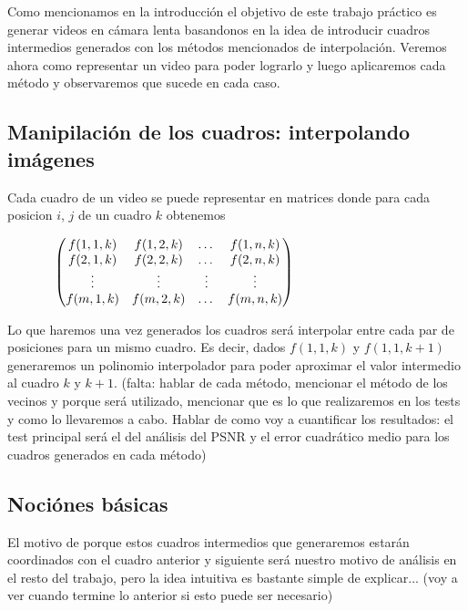Como mencionamos en la introducción el objetivo de este trabajo práctico es generar videos en cámara lenta basandonos en la idea de introducir cuadros intermedios generados con los métodos mencionados de interpolación. Veremos ahora como representar un video para poder lograrlo y luego aplicaremos cada método y observaremos que sucede en cada caso.

\subsection{Manipilación de los cuadros: interpolando imágenes}
Cada cuadro de un video se puede representar en matrices donde para cada posicion $i$, $j$ de un cuadro $k$ obtenemos 

\vspace{4mm}

$
\hspace{1.3cm}
     \begin{pmatrix}
      f(1, 1, k) & f(1, 2, k) & \dots & f(1, n, k) \\
	  f(2, 1, k) & f(2, 2, k) & \dots & f(2, n, k) \\
	  \vdots & \vdots & \vdots & \vdots \\
	  f(m, 1, k) & f(m, 2, k) & \dots & f(m, n, k) \\
     \end{pmatrix}
$

\vspace{4mm}

Lo que haremos una vez generados los cuadros será interpolar entre cada par de posiciones para un mismo cuadro. Es decir, dados $f(1, 1, k)$ y $f(1, 1, k+1)$ generaremos un polinomio interpolador para poder aproximar el valor intermedio al cuadro $k$ y $k+1$. (falta: hablar de cada método, mencionar el método de los vecinos y porque será utilizado, mencionar que es lo que realizaremos en los tests y como lo llevaremos a cabo. Hablar de como voy a cuantificar los resultados: el test principal será el del análisis del PSNR y el error cuadrático medio para los cuadros generados en cada método)

\subsection{Nociónes básicas}

El motivo de porque estos cuadros intermedios que generaremos estarán coordinados con el cuadro anterior y siguiente será nuestro motivo de análisis en el resto del trabajo, pero la idea intuitiva es  bastante simple de explicar... (voy a ver cuando termine lo anterior si esto puede ser necesario)










